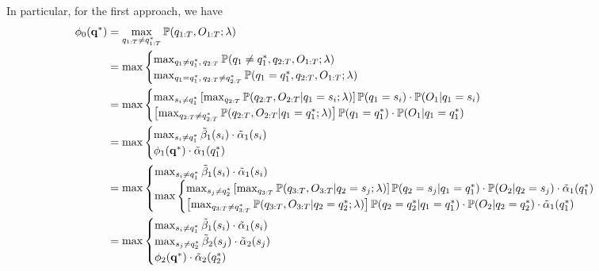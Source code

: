 In particular, for the first approach, we have
\begin{equation*}
\begin{aligned}
\phi_0(\mathbf{q}^*) 
&= \max_{q_{1:T} \ne q_{1:T}^*} \mathbb{P}(q_{1:T}, O_{1:T}; \lambda) \\
&= \max \begin{cases}
          \max_{q_1 \ne q_1^*, \, q_{2:T}} \mathbb{P}(q_1 \ne q_1^*, q_{2:T}, O_{1:T}; \lambda) \\
          \max_{q_1 = q_1^*, \, q_{2:T} \ne q_{2:T}^*} \mathbb{P}(q_1 = q_1^*, q_{2:T}, O_{1:T}; \lambda)
       \end{cases} \\
&= \max \begin{cases}
          \max_{s_i \ne q_1^*} \left[ \max_{q_{2:T}} \mathbb{P}(q_{2:T}, O_{2:T} |q_1 = s_i; \lambda) \right] \mathbb{P}(q_1 = s_i) \cdot \mathbb{P}(O_1 |q_1 = s_i) \\ 
          \left[ \max_{q_{2:T} \ne q_{2:T}^*} \mathbb{P}(q_{2:T}, O_{2:T} |q_1 = q_1^*; \lambda) \right] \mathbb{P}(q_1 = q_1^*) \cdot \mathbb{P}(O_1 |q_1 = q_1^*)
        \end{cases} \\
&= \max \begin{cases} 
          \max_{s_i \ne q_1^*} \tilde{\beta}_1(s_i) \cdot \tilde{\alpha}_1(s_i) \\
          \phi_1(\mathbf{q}^*) \cdot \tilde{\alpha}_1(q_1^*)
        \end{cases} \\
&= \max \begin{cases}
          \max_{s_i \ne q_1^*} \tilde{\beta}_1(s_i) \cdot \tilde{\alpha}_1(s_i) \\
          \max \begin{cases}
            \max_{s_j \ne q_2^*} \left[ \max_{q_{3:T}} \mathbb{P}(q_{3:T}, O_{3:T} |q_2 = s_j; \lambda) \right] \mathbb{P}(q_2 = s_j |q_1 = q_1^*) \cdot 
                 \mathbb{P}(O_2 |q_2 = s_j) \cdot \tilde{\alpha}_1(q_1^*) \\
            \left[ \max_{q_{3:T} \ne q_{3:T}^*} \mathbb{P}(q_{3:T}, O_{3:T} |q_2 = q_2^*; \lambda) \right]
                 \mathbb{P}(q_2 = q_2^* |q_1 = q_1^*) \cdot \mathbb{P}(O_2 |q_2 = q_2^*) \cdot \tilde{\alpha}_1(q_1^*)
          \end{cases}
        \end{cases} \\
&= \max \begin{cases}
          \max_{s_i \ne q_1^*} \tilde{\beta}_1(s_i) \cdot \tilde{\alpha}_1(s_i) \\
          \max_{s_j \ne q_2^*} \tilde{\beta}_2(s_j) \cdot \tilde{\alpha}_2(s_j) \\
          \phi_2(\mathbf{q}^*) \cdot \tilde{\alpha}_2(q_2^*)
        \end{cases}
\end{aligned}
\end{equation*}
